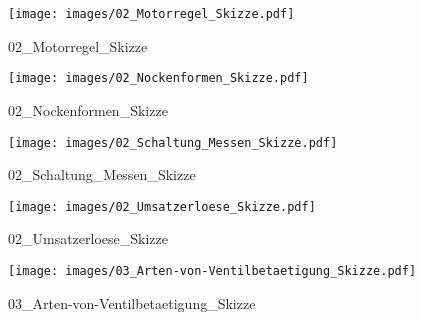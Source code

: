 %
%
\begin{figure}[!hb]%
    \centering
  \texttt{[image: images/02\_Motorregel\_Skizze.pdf]}%
  \caption{02_Motorregel_Skizze}%
\end{figure}

%
%
\begin{figure}[!hb]%
    \centering
  \texttt{[image: images/02\_Nockenformen\_Skizze.pdf]}%
  \caption{02_Nockenformen_Skizze}%
\end{figure}

%
%
\begin{figure}[!hb]%
    \centering
  \texttt{[image: images/02\_Schaltung\_Messen\_Skizze.pdf]}%
  \caption{02_Schaltung_Messen_Skizze}%
\end{figure}

%
%
\begin{figure}[!hb]%
    \centering
  \texttt{[image: images/02\_Umsatzerloese\_Skizze.pdf]}%
  \caption{02_Umsatzerloese_Skizze}%
\end{figure}

%
%
\begin{figure}[!hb]%
    \centering
  \texttt{[image: images/03\_Arten-von-Ventilbetaetigung\_Skizze.pdf]}%
  \caption{03_Arten-von-Ventilbetaetigung_Skizze}%
\end{figure}

